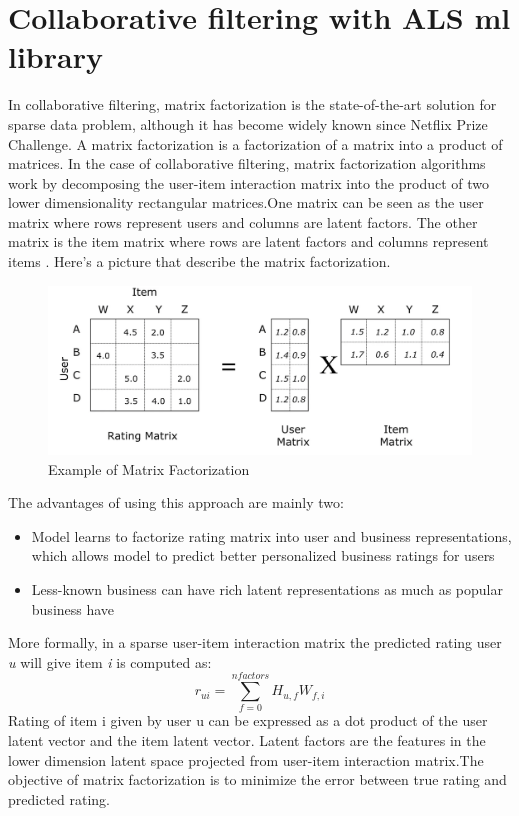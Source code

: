 \documentclass[12pt,english]{report}
\begin{document}
\section{Collaborative filtering with ALS ml library}
In collaborative filtering, matrix factorization is the state-of-the-art solution for sparse data problem, although it has become widely known since Netflix Prize Challenge.
A matrix factorization is a factorization of a matrix into a product of matrices. 
In the case of collaborative filtering, matrix factorization algorithms work by decomposing the user-item interaction matrix into the product of two lower dimensionality rectangular matrices.One matrix can be seen as the user matrix where rows represent users and columns are latent factors. The other matrix is the item matrix where rows are latent factors and columns represent items \cite{matrixfact}. Here's a picture that describe the matrix factorization.
\begin{figure}[hbtp]
\caption{Example of Matrix Factorization}
\centering
\includegraphics[scale=0.6]{../Images/matrixfact.png}
\end{figure}
The advantages of using this approach are mainly two:
\begin{itemize}
\item Model learns to factorize rating matrix into user and business representations, which allows model to predict better personalized business ratings for users
\item Less-known business can have rich latent representations as much as popular business have
\end{itemize}
More formally, in a sparse user-item interaction matrix the predicted rating user \textit{u} will give item \textit{i} is computed as:
$$r_{ui} = \sum_{f=0}^{nfactors} H_{u,f}W_{f,i}$$
Rating of item i given by user u can be expressed as a dot product of the user latent vector and the item latent vector.  Latent factors are the features in the lower dimension latent space projected from user-item interaction matrix.The objective of matrix factorization is to minimize the error between true rating and predicted rating.
\end{document}
